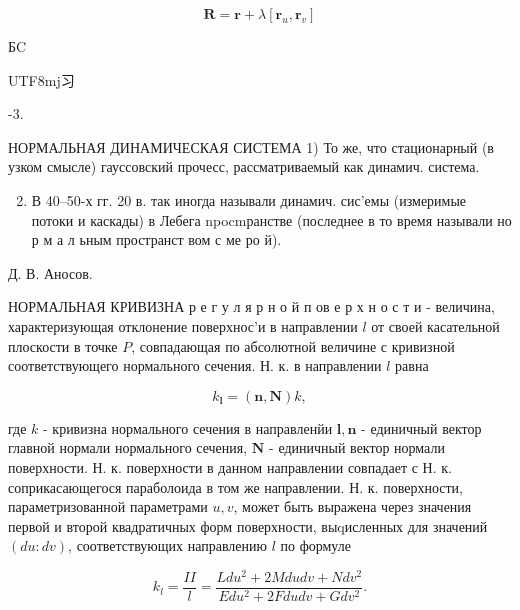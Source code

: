 \documentclass[10pt]{article}
\begin{document}
\[

\boldsymbol{R}=\boldsymbol{r}+\lambda\left[\boldsymbol{r}_{u}, \boldsymbol{r}_{v}\right]

\]



БC\begin{CJK}{UTF8}{mj}习\end{CJK}-3.



НОРМАЛЬНАЯ ДИНАМИЧЕСКАЯ СИСТЕМА 1) То же, что стационарный (в узком смысле) гауссовский прочесс, рассматриваемый как динамич. система.



\begin{enumerate}

  \setcounter{enumi}{1}

  \item В 40--50-х гг. 20 в. так иногда называли динамич. сис'емы (измеримые потоки и каскады) в Лебега npocmранстве (последнее в то время называли но р м а л ьным пространст вом с ме ро й).

\end{enumerate}



Д. В. Аносов.



НОРМАЛЬНАЯ КРИВИЗНА р е г у л я р н о й п ов е р х н о с т и - величина, характеризующая отклонение поверхнос'и в направлении $l$ от своей касательной плоскости в точке $P$, совпадающая по абсолютной величине с кривизной соответствующего нормального сечения. Н. к. в направлении $l$ равна



\[

k_{\boldsymbol{l}}=(\boldsymbol{n}, \boldsymbol{N}) k,

\]



где $k$ - кривизна нормального сечения в направленйи $\boldsymbol{l}, \boldsymbol{n}$ - единичный вектор главной нормали нормального сечения, $\boldsymbol{N}$ - единичный вектор нормали поверхности. Н. к. поверхности в данном направлении совпадает с Н. к. соприкасающегося параболоида в том же направлении. Н. к. поверхности, параметризованной параметрами $u, v$, может быть выражена через значения первой и второй квадратичных форм поверхности, выqисленных для значений $(d u: d v)$, соответствующих направлению $l$ по формуле



\[

k_{l}=\frac{I I}{l}=\frac{L d u^{2}+2 M d u d v+N d v^{2}}{E d u^{2}+2 F d u d v+G d v^{2}} .

\]
\end{document}
